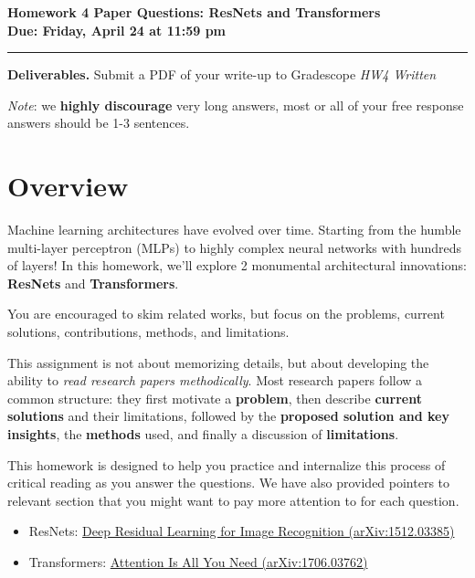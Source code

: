 \documentclass[11pt]{article}
\begin{document}
\begin{center}
    {\huge\bfseries Homework 4 Paper Questions: ResNets and Transformers}\\[6pt]
    \textbf{Due: Friday, April 24 at 11:59 pm}\\
\end{center}

\vspace{0.5em}\hrule\vspace{1em}

\noindent\textbf{Deliverables.} Submit a PDF of your write-up to Gradescope \emph{HW4 Written}

\noindent \textit{Note}: we \textbf{highly discourage} very long answers, most or all of your free response answers should be 1-3 sentences.
\vspace{0.3em}
\section*{Overview}
Machine learning architectures have evolved over time. Starting from the humble multi-layer perceptron (MLPs) to highly complex neural networks with hundreds of layers! In this homework, we'll explore 2 monumental architectural innovations: \textbf{ResNets} and \textbf{Transformers}.

You are encouraged to skim related works, but focus on the problems, current solutions, contributions, methods, and limitations.  

This assignment is not about memorizing details, but about developing the ability to \emph{read research papers methodically}.  
Most research papers follow a common structure: they first motivate a \textbf{problem}, then describe \textbf{current solutions} and their limitations, followed by the \textbf{proposed solution and key insights}, the \textbf{methods} used, and finally a discussion of \textbf{limitations}.  

This homework is designed to help you practice and internalize this process of critical reading as you answer the questions. We have also provided pointers to relevant section that you might want to pay more attention to for each question.

\begin{itemize}
  \item ResNets: \href{https://arxiv.org/abs/1512.03385}{Deep Residual Learning for Image Recognition (arXiv:1512.03385)}
  \item Transformers: \href{https://arxiv.org/abs/1706.03762}
  {Attention Is All You Need (arXiv:1706.03762)}
\end{itemize}
\end{document}
